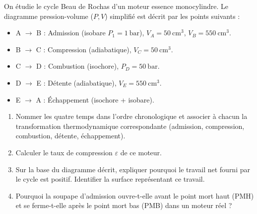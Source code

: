 \documentclass[11pt]{article}
\begin{document}
\begin{exercice}
On étudie le cycle Beau de Rochas d'un moteur essence monocylindre. Le diagramme pression-volume ($P,V$) simplifié est décrit par les points suivants : 
\begin{itemize}
    \item A $\to$ B : Admission (isobare $P_1 = \SI{1}{\bar}$), $V_A = \SI{50}{\centi\meter\cubed}$, $V_B = \SI{550}{\centi\meter\cubed}$.
    \item B $\to$ C : Compression (adiabatique), $V_C = \SI{50}{\centi\meter\cubed}$.
    \item C $\to$ D : Combustion (isochore), $P_D = \SI{50}{\bar}$.
    \item D $\to$ E : Détente (adiabatique), $V_E = \SI{550}{\centi\meter\cubed}$.
    \item E $\to$ A : Échappement (isochore + isobare).
\end{itemize}

\begin{enumerate}
    \item Nommer les quatre temps dans l'ordre chronologique et associer à chacun la transformation thermodynamique correspondante (admission, compression, combustion, détente, échappement).
    \item Calculer le taux de compression $\varepsilon$ de ce moteur.
    \item Sur la base du diagramme décrit, expliquer pourquoi le travail net fourni par le cycle est positif. Identifier la surface représentant ce travail.
    \item Pourquoi la soupape d'admission ouvre-t-elle avant le point mort haut (PMH) et se ferme-t-elle après le point mort bas (PMB) dans un moteur réel ?
\end{enumerate}
\end{exercice}
\end{document}
